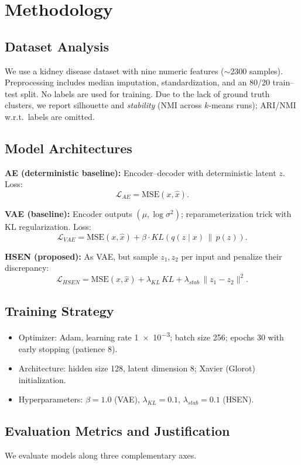 \documentclass[12pt,a4paper]{article}
\begin{document}
\section{Methodology}

\subsection{Dataset Analysis}
We use a kidney disease dataset with nine numeric features ($\sim$2300 samples). Preprocessing includes median imputation, standardization, and an 80/20 train--test split. No labels are used for training. Due to the lack of ground truth clusters, we report silhouette and \emph{stability} (NMI across $k$-means runs); ARI/NMI w.r.t.\ labels are omitted.

\subsection{Model Architectures}
\textbf{AE (deterministic baseline):} Encoder--decoder with deterministic latent $z$. Loss:
\[
\mathcal{L}_{AE} = \mathrm{MSE}(x,\hat{x}).
\]

\textbf{VAE (baseline):} Encoder outputs $(\mu,\log\sigma^2)$; reparameterization trick with KL regularization. Loss:
\[
\mathcal{L}_{VAE} = \mathrm{MSE}(x,\hat{x}) + \beta \cdot KL\!\left(q(z\mid x)\,\|\,p(z)\right).
\]

\textbf{HSEN (proposed):} As VAE, but sample $z_1,z_2$ per input and penalize their discrepancy:
\[
\mathcal{L}_{HSEN} = \mathrm{MSE}(x,\hat{x}) + \lambda_{KL}\,KL + \lambda_{stab}\,\|z_1 - z_2\|^2.
\]

\subsection{Training Strategy}
\begin{itemize}
  \item Optimizer: Adam, learning rate \num{1e-3}; batch size 256; epochs 30 with early stopping (patience 8).
  \item Architecture: hidden size 128, latent dimension 8; Xavier (Glorot) initialization.
  \item Hyperparameters: $\beta=1.0$ (VAE), $\lambda_{KL}=0.1$, $\lambda_{stab}=0.1$ (HSEN).
\end{itemize}

\subsection{Evaluation Metrics and Justification}
\label{subsec:metric-justification}
We evaluate models along three complementary axes.
\end{document}
